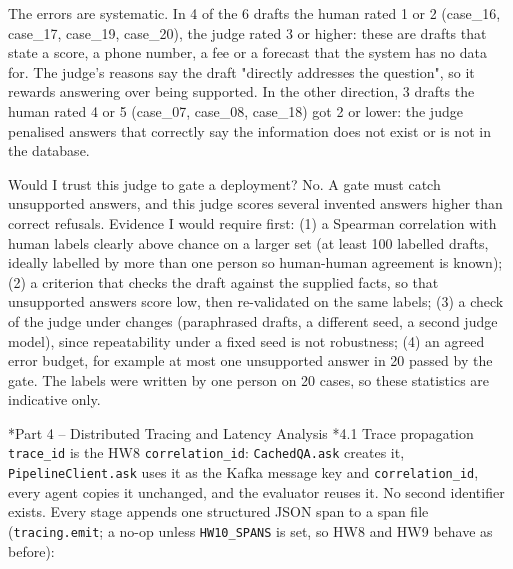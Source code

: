 \documentclass[11pt]{article}
\makeatletter
\renewcommand\section{\@startsection{section}{1}{\z@}{-3.0ex \@plus -1ex \@minus -.2ex}{1.2ex \@plus.2ex}{\normalfont\fontsize{14}{17}\selectfont\bfseries}}
\renewcommand\subsection{\@startsection{subsection}{2}{\z@}{-2.2ex \@plus -1ex \@minus -.2ex}{0.8ex \@plus.2ex}{\normalfont\fontsize{12}{14.5}\selectfont\bfseries}}
\makeatother
\begin{document}
The errors are systematic. In 4 of the 6 drafts the human rated 1 or 2 (case\_\allowbreak{}16, case\_\allowbreak{}17, case\_\allowbreak{}19, case\_\allowbreak{}20), the judge rated 3 or higher: these are drafts that state a score, a phone number, a fee or a forecast that the system has no data for. The judge's reasons say the draft "directly addresses the question", so it rewards answering over being supported. In the other direction, 3 drafts the human rated 4 or 5 (case\_\allowbreak{}07, case\_\allowbreak{}08, case\_\allowbreak{}18) got 2 or lower: the judge penalised answers that correctly say the information does not exist or is not in the database.

Would I trust this judge to gate a deployment? No. A gate must catch unsupported answers, and this judge scores several invented answers higher than correct refusals. Evidence I would require first: (1) a Spearman correlation with human labels clearly above chance on a larger set (at least 100 labelled drafts, ideally labelled by more than one person so human-human agreement is known); (2) a criterion that checks the draft against the supplied facts, so that unsupported answers score low, then re-validated on the same labels; (3) a check of the judge under changes (paraphrased drafts, a different seed, a second judge model), since repeatability under a fixed seed is not robustness; (4) an agreed error budget, for example at most one unsupported answer in 20 passed by the gate. The labels were written by one person on 20 cases, so these statistics are indicative only.

\section*{Part 4 -- Distributed Tracing and Latency Analysis}
\subsection*{4.1 Trace propagation}
\texttt{trace\_\allowbreak{}id} is the HW8 \texttt{correlation\_\allowbreak{}id}: \texttt{CachedQA.ask} creates it, \texttt{PipelineClient.ask} uses it as the Kafka message key and \texttt{correlation\_\allowbreak{}id}, every agent copies it unchanged, and the evaluator reuses it. No second identifier exists. Every stage appends one structured JSON span to a span file (\texttt{tracing.emit}; a no-op unless \texttt{HW10\_\allowbreak{}SPANS} is set, so HW8 and HW9 behave as before):
\end{document}
